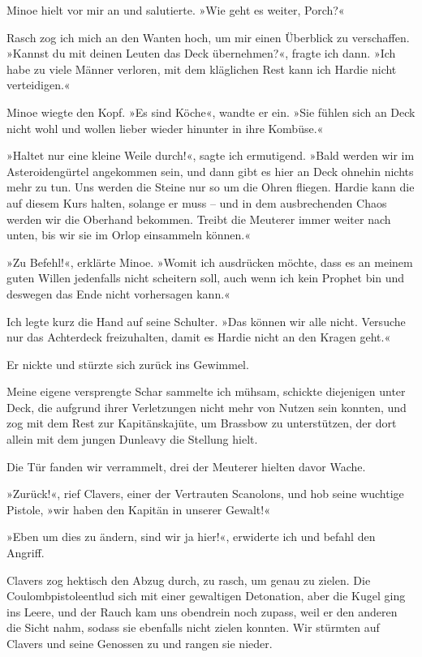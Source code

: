 Minoe hielt vor mir an und salutierte. »Wie geht es weiter,
Porch?«

Rasch zog ich mich an den Wanten hoch, um mir einen Überblick zu
verschaffen. »Kannst du mit deinen Leuten das Deck übernehmen?«,
fragte ich dann. »Ich habe zu viele Männer verloren, mit dem
kläglichen Rest kann ich Hardie nicht verteidigen.«

Minoe wiegte den Kopf. »Es sind Köche«, wandte er ein. »Sie fühlen
sich an Deck nicht wohl und wollen lieber wieder hinunter in ihre
Kombüse.«

»Haltet nur eine kleine Weile durch!«, sagte ich ermutigend. »Bald
werden wir im Asteroidengürtel angekommen sein, und dann gibt es
hier an Deck ohnehin nichts mehr zu tun. Uns werden die Steine nur
so um die Ohren fliegen. Hardie kann die  auf
diesem Kurs halten, solange er muss – und in dem ausbrechenden
Chaos werden wir die Oberhand bekommen. Treibt die Meuterer immer
weiter nach unten, bis wir sie im Orlop einsammeln können.«

»Zu Befehl!«, erklärte Minoe. »Womit ich ausdrücken möchte, dass es
an meinem guten Willen jedenfalls nicht scheitern soll, auch wenn
ich kein Prophet bin und deswegen das Ende nicht vorhersagen
kann.«

Ich legte kurz die Hand auf seine Schulter. »Das können wir alle
nicht. Versuche nur das Achterdeck freizuhalten, damit es Hardie
nicht an den Kragen geht.«

Er nickte und stürzte sich zurück ins Gewimmel.

\bigpar

Meine eigene versprengte Schar sammelte ich mühsam, schickte
diejenigen unter Deck, die aufgrund ihrer Verletzungen nicht mehr
von Nutzen sein konnten, und zog mit dem Rest zur Kapitänskajüte,
um Brassbow zu unterstützen, der dort allein mit dem jungen
Dunleavy die Stellung hielt.

Die Tür fanden wir verrammelt, drei der Meuterer hielten davor
Wache.

»Zurück!«, rief Clavers, einer der Vertrauten Scanolons, und hob
seine wuchtige Pistole, »wir haben den Kapitän in unserer Gewalt!«

»Eben um dies zu ändern, sind wir ja hier!«, erwiderte ich und
befahl den Angriff.

Clavers zog hektisch den Abzug durch, zu rasch, um genau zu zielen.
Die Coulombpistoleentlud sich mit einer gewaltigen Detonation, aber
die Kugel ging ins Leere, und der Rauch kam uns obendrein noch
zupass, weil er den anderen die Sicht nahm, sodass sie ebenfalls
nicht zielen konnten. Wir stürmten auf Clavers und seine Genossen
zu und rangen sie nieder.

